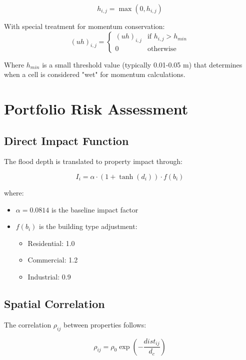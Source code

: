 \documentclass{article}
\begin{document}
\begin{equation}
h_{i,j} = \max(0, h_{i,j})
\end{equation}

With special treatment for momentum conservation:
\begin{equation}
(uh)_{i,j} = \begin{cases}
(uh)_{i,j} & \text{if } h_{i,j} > h_{min} \\
0 & \text{otherwise}
\end{cases}
\end{equation}

Where $h_{min}$ is a small threshold value (typically 0.01-0.05 m) that determines when a cell is considered "wet" for momentum calculations.

\section{Portfolio Risk Assessment}

\subsection{Direct Impact Function}
The flood depth is translated to property impact through:

\begin{equation}
I_i = \alpha \cdot (1 + \tanh(d_i)) \cdot f(b_i)
\end{equation}

where:
\begin{itemize}
\item $\alpha = 0.0814$ is the baseline impact factor
\item $f(b_i)$ is the building type adjustment:
    \begin{itemize}
    \item Residential: 1.0
    \item Commercial: 1.2
    \item Industrial: 0.9
    \end{itemize}
\end{itemize}

\subsection{Spatial Correlation}
The correlation $\rho_{ij}$ between properties follows:

\begin{equation}
\rho_{ij} = \rho_0 \exp(-\frac{dist_{ij}}{d_c})
\end{equation}
\end{document}
